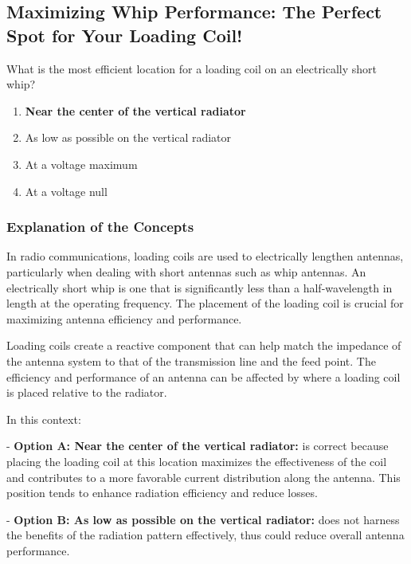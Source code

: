\subsection{Maximizing Whip Performance: The Perfect Spot for Your Loading Coil!}

\begin{tcolorbox}[colback=gray!10, colframe=black, title=E9D03] What is the most efficient location for a loading coil on an electrically short whip? 
\begin{enumerate}[label=\Alph*.]
    \item \textbf{Near the center of the vertical radiator}
    \item As low as possible on the vertical radiator
    \item At a voltage maximum
    \item At a voltage null
\end{enumerate} \end{tcolorbox}

\subsubsection{Explanation of the Concepts}

In radio communications, loading coils are used to electrically lengthen antennas, particularly when dealing with short antennas such as whip antennas. An electrically short whip is one that is significantly less than a half-wavelength in length at the operating frequency. The placement of the loading coil is crucial for maximizing antenna efficiency and performance.

Loading coils create a reactive component that can help match the impedance of the antenna system to that of the transmission line and the feed point. The efficiency and performance of an antenna can be affected by where a loading coil is placed relative to the radiator.

In this context:

- \textbf{Option A: Near the center of the vertical radiator:} is correct because placing the loading coil at this location maximizes the effectiveness of the coil and contributes to a more favorable current distribution along the antenna. This position tends to enhance radiation efficiency and reduce losses.

- \textbf{Option B: As low as possible on the vertical radiator:} does not harness the benefits of the radiation pattern effectively, thus could reduce overall antenna performance.

